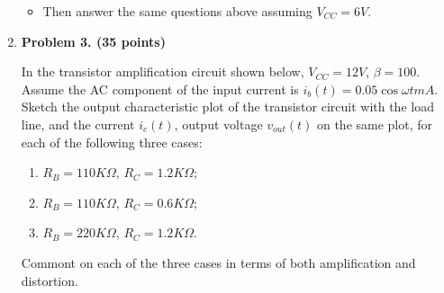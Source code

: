 \begin{enumerate}
\begin{itemize}
\item Then answer the same questions above assuming $V_{CC}=6 V$. 
\end{itemize}




\item {\bf Problem 3. (35 points)}

In the transistor amplification circuit shown below, $V_{CC}=12V$, 
$\beta=100$. Assume the AC component of the input current is 
$i_b(t)=0.05\cos \omega t mA$. Sketch the output characteristic plot 
of the transistor circuit with the load line, and the current $i_c(t)$,
output voltage $v_{out}(t)$ on the same plot, for each of the 
following three cases:
\begin{enumerate}
\item $R_B=110 K\Omega$, $R_C=1.2 K\Omega$;
\item $R_B=110 K\Omega$, $R_C=0.6 K\Omega$;
\item $R_B=220 K\Omega$, $R_C=1.2 K\Omega$.
\end{enumerate}
Commont on each of the three cases in terms of both amplification and 
distortion.








\end{enumerate}
